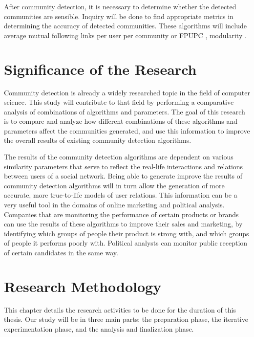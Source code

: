 After community detection, it is necessary to determine whether the detected communities are sensible. Inquiry will be done to find appropriate metrics in determining the accuracy of detected communities. These algorithms will include average mutual following links per user per community or FPUPC \cite{Zhang:2012}, modularity \cite{Deitrick:2013}.


\section{Significance of the Research}
\label{sec:significance}




Community detection is already a widely researched topic in the field of computer science. This study will contribute to that field by performing a comparative analysis of combinations of algorithms and parameters. The goal of this research is to compare and analyze how different combinations of these algorithms and parameters affect the communities generated, and use this information to improve the overall results of existing community detection algorithms. 


The results of the community detection algorithms are dependent on various similarity parameters that serve to reflect the real-life interactions and relations between users of a social network. Being able to generate improve the results of community detection algorithms will in turn allow the generation of more accurate, more true-to-life models of user relations. This information can be a very useful tool in the domains of online marketing and political analysis. Companies that are monitoring the performance of certain products or brands can use the results of these algorithms to improve their sales and marketing, by identifying which groups of people their product is strong with, and which groups of people it performs poorly with. Political analysts can monitor public reception of certain candidates in the same way.




\section{Research Methodology}
This chapter details the research activities to be done for the duration of this thesis. Our study will be in three main parts: the preparation phase, the iterative experimentation phase, and the analysis and finalization phase.




